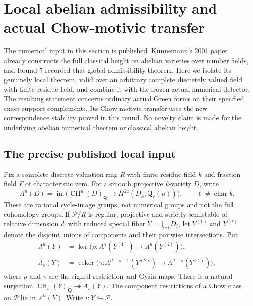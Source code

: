 \section{Local abelian admissibility and actual Chow-motivic transfer}
\label{r16ab:section}

The numerical input in this section is published.  K\"unnemann's
2001 paper already constructs the full classical height on abelian
varieties over number fields, and Round 7 recorded that global
admissibility theorem.  Here we isolate its genuinely local theorem,
valid over an arbitrary complete discretely valued field with finite
residue field, and combine it with the frozen actual numerical detector.
The resulting statement concerns ordinary actual Green forms on their
specified exact support complements.  Its Chow-motivic transfer uses
the new correspondence stability proved in this round.  No novelty
claim is made for the underlying abelian numerical theorem or classical
abelian height.

\subsection{The precise published local input}

Fix a complete discrete valuation ring $R$ with finite residue field
$k$ and fraction field $F$ of characteristic zero.  For a smooth
projective $k$-variety $D$, write
\[
 A^u(D)=\operatorname{im}\bigl(\operatorname{CH}^u(D)_{\mathbf Q}
          \longrightarrow H^{2u}(D_{\bar k},\mathbf Q_\ell(u))\bigr),
 \qquad \ell\ne\operatorname{char}k.
 \tag{AB16.1}\label{r16ab:cycle-image}
\]
These are rational cycle-image groups, not numerical groups and not
the full cohomology groups.  If $\mathcal P/R$ is regular, projective
and strictly semistable of relative dimension $d$, with reduced
special fiber $Y=\bigcup_iD_i$, let $Y^{(1)}$ and $Y^{(2)}$ denote
the disjoint unions of components and their pairwise intersections.
Put
\[
 \begin{split}
 A^u(Y)&=\ker\bigl(\rho:A^u(Y^{(1)})\to A^u(Y^{(2)})\bigr),\\
 A_s(Y)&=\operatorname{coker}\bigl(
       \gamma:A^{d-s-1}(Y^{(2)})\to A^{d-s}(Y^{(1)})\bigr),
 \end{split}
 \tag{AB16.2}\label{r16ab:strata-groups}
\]
where $\rho$ and $\gamma$ are the signed restriction and Gysin maps.
There is a natural surjection
$\operatorname{CH}_s(Y)_{\mathbf Q}\twoheadrightarrow A_s(Y)$.
The component restrictions of a Chow class on $\mathcal P$ lie in
$A^u(Y)$.  Write $i:Y\hookrightarrow\mathcal P$.

